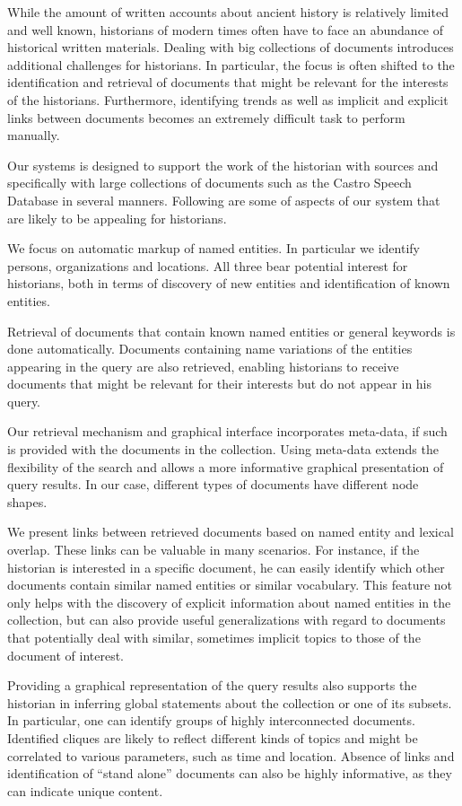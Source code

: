 While the amount of written accounts about ancient history is relatively limited and well known, historians of modern times often have to 
face an abundance of historical written materials. Dealing with big collections of documents introduces additional challenges for historians. 
In particular, the focus is often shifted to the identification and retrieval of documents that might be relevant for the interests of the 
historians. Furthermore, identifying trends as well as implicit and explicit links between documents becomes an extremely difficult task to 
perform manually.

Our systems is designed to support the work of the historian with sources and specifically with large collections of documents such as the 
Castro Speech Database in several manners. Following are some of aspects of our system that are likely to be appealing for historians.

We focus on automatic markup of named entities. In particular we identify persons, organizations and locations. All three bear potential 
interest for historians, both in terms of discovery of new entities and identification of known entities. 

Retrieval of documents that contain known named entities or general keywords is done automatically. Documents containing name variations of 
the entities appearing in the query are also retrieved, enabling historians to receive documents that might be relevant for their interests 
but do not appear in his query. 

Our retrieval mechanism and graphical interface incorporates meta-data, if such is provided with the documents in the collection. 
Using meta-data extends the flexibility of the search and allows a more informative graphical presentation of query results. In our case, 
different types of documents have different node shapes. 

We present links between retrieved documents based on named entity and lexical overlap. These links can be valuable in many scenarios. 
For instance, if the historian is interested in a specific document, he can easily identify which other documents contain similar named 
entities or similar vocabulary.  This feature not only helps with the discovery of explicit information about named entities in the 
collection, but can also provide useful generalizations with regard to documents that potentially deal with similar, sometimes implicit 
topics to those of the document of interest.   

Providing a graphical representation of the query results also supports the historian in inferring global statements about the collection or 
one of its subsets. In particular, one can identify groups of highly interconnected documents. Identified cliques are likely to reflect 
different kinds of topics and might be correlated to various parameters, such as time and location. Absence of links and identification of 
``stand alone'' documents can also be highly informative, as they can indicate unique content. 

